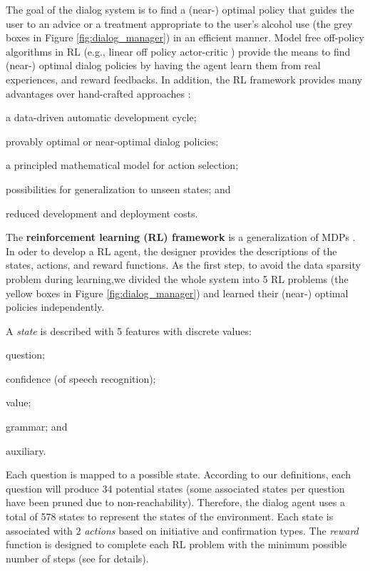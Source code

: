 \documentclass[letterpaper]{article}
\begin{document}
\begin{sloppy}
The goal of the dialog system is to find a (near-) optimal policy that guides the user to an advice 
or a treatment appropriate to the user's alcohol use (the grey boxes in Figure 
\ref{fig:dialog_manager}) in an efficient manner. 
Model free off-policy algorithms in RL (e.g., linear off policy actor-critic \cite{DegrisWS12}) 
provide the  means to find (near-) optimal dialog policies by having the agent learn them 
from real experiences, and reward feedbacks. In addition, the RL framework provides many advantages 
over hand-crafted approaches \cite{lemon2007machine}: \begin{inparaenum}[1)] \item a 
data-driven automatic development cycle; \item provably optimal or near-optimal dialog policies; 
\item  a principled mathematical model for action selection; \item  possibilities for 
generalization 
to unseen states; and \item reduced development and deployment costs.\end{inparaenum} 

The {\bf reinforcement learning (RL) framework} is a generalization of MDPs 
\cite{sutton1998reinforcement}. In oder to develop a RL 
agent, the designer provides the descriptions of the states, actions, and reward functions. As the 
first step, to avoid the data sparsity problem during learning,we
divided  the whole system into 5 RL problems (the yellow boxes in Figure \ref{fig:dialog_manager}) 
and learned their 
(near-) optimal policies independently. 

A {\em state} is described with 5 features with discrete values: \begin{inparaenum}[1)] \item 
question; 
\item confidence (of speech recognition); \item value; \item grammar; and \item auxiliary. 
\end{inparaenum} Each 
question is mapped to a possible state. According to our definitions, each question will produce 34 
potential states (some associated states per question have been pruned due to non-reachability). 
Therefore, the dialog agent uses a total of 578 states to represent the states of the environment. 
Each 
state is associated with 2 {\em actions} based on initiative and  confirmation types. The 
{\em reward} 
function is designed to complete each RL problem with the minimum possible number of steps (see 
\cite{YASCLL14} for details).  


\end{sloppy}
\end{document}
